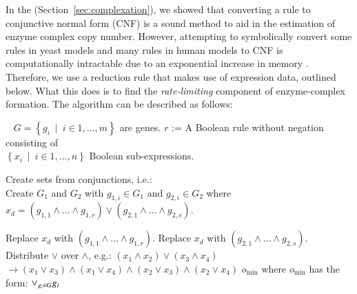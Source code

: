 In the \suppOrApp (Section~\ref{sec:complexation}), we showed that
converting a rule to conjunctive normal form (CNF) is a sound method to aid in the estimation of
enzyme complex copy number.  However, attempting to symbolically
convert some rules in yeast models and many rules in human models to
CNF is computationally intractable due to an exponential increase in
memory \citep{Russell2009}. Therefore, we use a reduction rule that
makes use of expression data, outlined below. What this does is to
find the \emph{rate-limiting} component of enzyme-complex
formation. The algorithm can be described as follows:

\begin{AlgFloat}[H]
\begin{Algorithm}
\label{alg:ReductionToCNF}
\begin{algorithmic}
~
\INPUT $G = \left\{g_i~\mid~i \in{1, \ldots, m}\right\}$ are genes. 
\INPUT $r$ := A Boolean rule without negation consisting of\\
  $\left\{x_i~\mid~i \in{1, \ldots, n}\right\}$ Boolean sub-expressions.
  \State \parbox[t]{\dimexpr\linewidth-\algorithmicindent}{Create sets from conjunctions, i.e.:\\
    \hspace{4.8 mm} Create $G_1$ and $G_2$ with $g_{1,i} \in G_1$ 
                    and $g_{2,i} \in G_2$ where\\ 
    \hspace{4.8 mm} $x_d = (g_{1,1} \land \ldots \land g_{1,r}) \lor 
                     (g_{2,1} \land \ldots \land g_{2,s})$. 
    \strut}
    \State Replace $x_d$ with $(g_{1,1} \land \ldots \land g_{1,r})$.
    \State Replace $x_d$ with $(g_{2,1} \land \ldots \land g_{2,s})$.
    \EndIf 
  \EndIf
  \State Distribute $\lor$ over $\land$, e.g.: $(x_1 \land x_2) 
          \lor (x_3 \land x_4)$ \\ 
    \hspace{4.8 mm} $\rightarrow (x_1 \lor x_3) \land (x_1 \lor x_4) \land 
          (x_2 \lor x_3) \land (x_2 \lor x_4)$
\EndWhile
\OUTPUT $o_{\min}$ where $o_{\min}$ has the form: $\lor_{g_i \in G} g_i$
\end{algorithmic} 
\end{Algorithm}
\end{AlgFloat}


